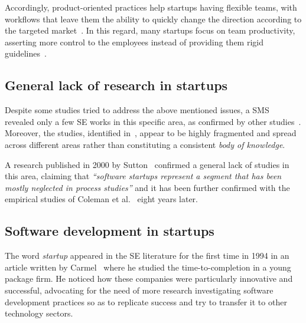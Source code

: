 \documentclass[10pt,journal,letterpaper,compsoc]{IEEEtran}
\begin{document}
Accordingly, product-oriented practices help startups having flexible teams,
with workflows that leave them the ability to quickly change the direction
according to the targeted market~\cite{Heitlager2007,Sutton2000}. In this
regard, many startups focus on team productivity, asserting more control to the
employees instead of providing them rigid guidelines~\cite{Tanabian2005,
Chorev2006, Kakati2003}.

\subsection{General lack of research in startups} Despite some studies tried to
address the above mentioned issues, a SMS~\cite{SMS} revealed only a few SE
works in this specific area, as confirmed by other studies~\cite{Coleman2008,
Coleman2008a, Coleman2007, Sutton2000}. Moreover, the studies, identified 
in~\cite{SMS}, appear to be highly fragmented and spread across different areas
rather than constituting a consistent \textit{body of knowledge}.

A research published in 2000 by Sutton~\cite{Sutton2000} confirmed a general
lack of studies in this area, claiming that \textit{``software startups
represent a segment that has been mostly neglected in process studies''} and it
has been further confirmed with the empirical studies of Coleman et 
al.~\cite{Coleman2008,Coleman2008a,Coleman2007} eight years later.

\subsection{Software development in startups}

The word \textit{startup} appeared in the SE literature for the first time in
1994 in an article written by Carmel~\cite{Camel1994a} where he studied the
time-to-completion in a young package firm. %
He noticed how these companies were particularly innovative and successful, 
advocating for the need of more research investigating software development 
practices so as to replicate success and try to transfer it to other 
technology sectors.
\end{document}

